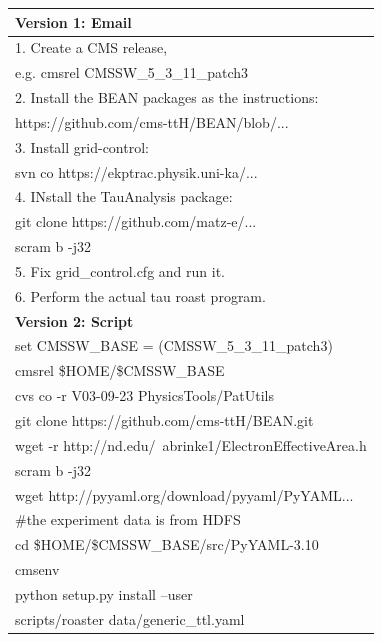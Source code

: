 \documentclass{acm_proc_article-sp}
\begin{document}
\begin{table}
    \centering
    \begin{tabular}{|l|}
        \hline
        {\bf Version 1: Email}\\ \hline
        1. Create a CMS release,\\
            \hspace{9pt} e.g. cmsrel CMSSW\_5\_3\_11\_patch3 \\
        2. Install the BEAN packages as the instructions: \\
            \hspace{9pt} https://github.com/cms-ttH/BEAN/blob/...\\
        3. Install grid-control: \\ 
            \hspace{9pt} svn co https://ekptrac.physik.uni-ka/... \\
        4. INstall the TauAnalysis package: \\
           \hspace{9pt} git clone https://github.com/matz-e/... \\
           \hspace{9pt} scram b -j32 \\
        5. Fix grid\_control.cfg and run it. \\
        6. Perform the actual tau roast program. \\ 
        \hline
        {\bf Version 2: Script}\\ \hline
        set CMSSW\_BASE = (CMSSW\_5\_3\_11\_patch3) \\
        cmsrel \$HOME/\$CMSSW\_BASE \\
        cvs co -r V03-09-23 PhysicsTools/PatUtils \\
        git clone https://github.com/cms-ttH/BEAN.git \\
        wget -r http://nd.edu/~abrinke1/ElectronEffectiveArea.h \\
        scram b -j32 \\
        wget http://pyyaml.org/download/pyyaml/PyYAML...\\
        \#the experiment data is from HDFS \\
        cd \$HOME/\$CMSSW\_BASE/src/PyYAML-3.10\\
        cmsenv\\
        python setup.py install --user \\
        scripts/roaster data/generic\_ttl.yaml \\ 
        \hline

\end{tabular}
\end{table}
\end{document}

